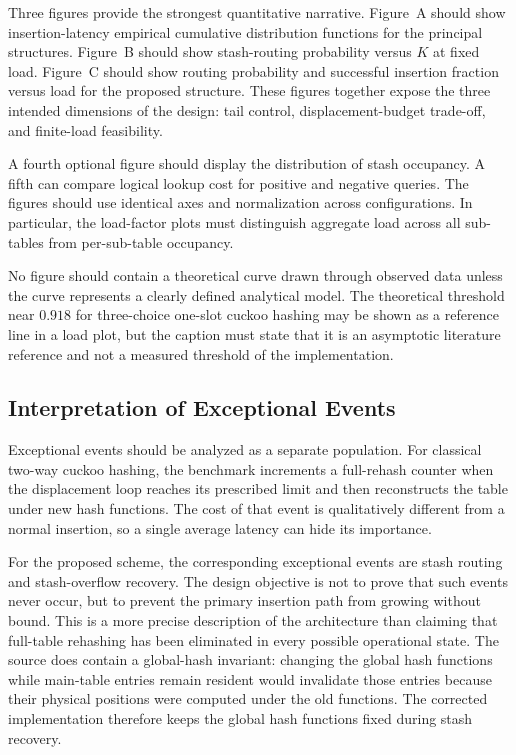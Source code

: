 \documentclass[conference]{IEEEtran}
\begin{document}
Three figures provide the strongest quantitative narrative. Figure~A should show insertion-latency empirical cumulative distribution functions for the principal structures. Figure~B should show stash-routing probability versus $K$ at fixed load. Figure~C should show routing probability and successful insertion fraction versus load for the proposed structure. These figures together expose the three intended dimensions of the design: tail control, displacement-budget trade-off, and finite-load feasibility.

A fourth optional figure should display the distribution of stash occupancy. A fifth can compare logical lookup cost for positive and negative queries. The figures should use identical axes and normalization across configurations. In particular, the load-factor plots must distinguish aggregate load across all sub-tables from per-sub-table occupancy.

No figure should contain a theoretical curve drawn through observed data unless the curve represents a clearly defined analytical model. The theoretical threshold near $0.918$ for three-choice one-slot cuckoo hashing may be shown as a reference line in a load plot, but the caption must state that it is an asymptotic literature reference and not a measured threshold of the implementation.

\subsection{Interpretation of Exceptional Events}
\label{subsec:exceptional_events}

Exceptional events should be analyzed as a separate population. For classical two-way cuckoo hashing, the benchmark increments a full-rehash counter when the displacement loop reaches its prescribed limit and then reconstructs the table under new hash functions. The cost of that event is qualitatively different from a normal insertion, so a single average latency can hide its importance.

For the proposed scheme, the corresponding exceptional events are stash routing and stash-overflow recovery. The design objective is not to prove that such events never occur, but to prevent the primary insertion path from growing without bound. This is a more precise description of the architecture than claiming that full-table rehashing has been eliminated in every possible operational state. The source does contain a global-hash invariant: changing the global hash functions while main-table entries remain resident would invalidate those entries because their physical positions were computed under the old functions. The corrected implementation therefore keeps the global hash functions fixed during stash recovery.
\end{document}
